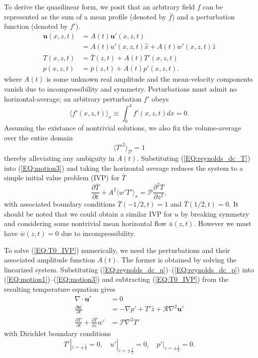 \documentclass[reprint,amsmath,amssymb,aps]{revtex4-1}
\begin{document}
To derive the quasilinear form, we posit that an arbitrary field $f$ can be represented as the sum of a mean profile (denoted by $\bar{f}$) and a perturbation function (denoted by $f'$).
\begin{align}
    \mathbf{u}(x, z, t) &= A(t) \mathbf{u'}(x, z, t) \label{EQ:reynolds_dc_u}\\
    &= A(t) u'(x, z, t)\hat{x} + A(t) w'(x, z, t)\hat{z} \\
    T(x, z, t) &= \bar{T}(z, t) + A(t) T'(x, z, t) \label{EQ:reynolds_dc_T}\\
    p(x, z, t) &= \bar{p}(z, t) + A(t) p'(x, z, t) \label{EQ:reynolds_dc_p}.
\end{align}
where $A(t)$ is some unknown real amplitude and the mean-velocity components vanish due to incompressibility and symmetry. Perturbations must admit no horizontal-average; an arbitrary perturbation $f'$ obeys
\begin{equation}
    \langle f'(x, z, t) \rangle_x \equiv \int_{0}^4 f'(x, z, t) dx = 0.
\end{equation}
Assuming the existance of nontrivial solutions, we also fix the volume-average over the entire domain
\begin{equation}
  \langle T'^2 \rangle_{\mathcal{D}} = 1
\end{equation}
thereby alleviating any ambiguity in $A(t)$. 
Substituting (\ref{EQ:reynolds_dc_T}) into (\ref{EQ:motion3}) and taking the horizontal average reduces the system to a simple initial value problem (IVP) for $\bar{T}$
\begin{equation}
  \frac{\partial \bar{T}}{\partial t} + A^2 \langle w'T' \rangle_x = \mathcal{P}  \frac{\partial^2 \bar{T}}{\partial z^2}, \label{EQ:T0_IVP}
\end{equation}
with associated boundary conditions $\bar{T}(-1/2, t) = 1$ and $\bar{T}(1/2, t) = 0$. It should be noted that we could obtain a similar IVP for $u$ by breaking symmetry and considering some nontrivial mean horizontal flow $\bar{u}(z, t)$. However we must have $\bar{w}(z, t) = 0$ due to incompressibility.

To solve (\ref{EQ:T0_IVP}) numerically, we need the perturbations and their associated amplitude function $A(t)$. 
The former is obtained by solving the linearized system. Substituting (\ref{EQ:reynolds_dc_u})--(\ref{EQ:reynolds_dc_p}) into (\ref{EQ:motion1})--(\ref{EQ:motion3}) and subtracting (\ref{EQ:T0_IVP}) from the resulting temperature equation gives
\begin{align}
    \nabla \cdot \mathbf{u'} &= 0 \label{EQ:linear1}\\
    \frac{\partial\mathbf{u'}}{\partial t} &= - \nabla p' + T'\hat{z} + \mathcal{R} \nabla^2 \mathbf{u'} \label{EQ:linear2}\\
    \frac{\partial T'}{\partial t} + \frac{\partial \bar{T}}{\partial z} w' &= \mathcal{P} \nabla^2 T' \label{EQ:linear3}
\end{align}
with Dirichlet boundary conditions 
\begin{equation}
    T'|_{z = \pm \frac{1}{2}} = 0, \quad u'|_{z = \pm \frac{1}{2}} = 0, \quad p'|_{z = \pm \frac{1}{2}} = 0.
\end{equation}
\end{document}
